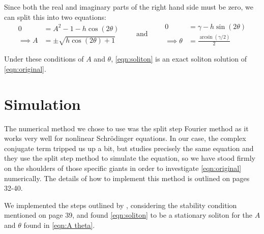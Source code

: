 \documentclass[11pt]{article}
\numberwithin{equation}{section}
\numberwithin{figure}{section}
\numberwithin{table}{section}
\begin{document}
Since both the real and imaginary parts of the right hand side must be zero, we can split this into two equations:
\begin{equation}
    \begin{aligned}
        0&=A^2-1-h\cos(2\theta)\\
        \implies A&=\pm\sqrt{h\cos(2\theta)+1}
    \end{aligned}
    \qquad\textrm{and}\qquad
    \begin{aligned}
        0&=\gamma-h\sin(2\theta)\\
        \implies \theta&=\frac{\arcsin(\gamma/2)}{2}
    \end{aligned}
    \label{eqn:A theta}
\end{equation}
\par Under these conditions of $A$ and $\theta$, \cref{eqn:soliton} is an exact soliton solution of \cref{eqn:original}. 

\section{Simulation}\label{sec:simulation}
\par The numerical method we chose to use was the split step Fourier method as it works very well for nonlinear Schr\"odinger equations. In our case, the complex conjugate term tripped us up a bit, but \cite{Mariana Bondila} studies precisely the same equation and they use the split step method to simulate the equation, so we have stood firmly on the shoulders of those specific giants in order to investigate \cref{eqn:original} numerically. The details of how to implement this method is outlined on pages 32-40.
\par We implemented the steps outlined by \cite{Mariana Bondila}, considering the stability condition mentioned on page 39, and found \cref{eqn:soliton} to be a stationary soliton for the $A$ and $\theta$ found in \cref{eqn:A theta}.
\end{document}
